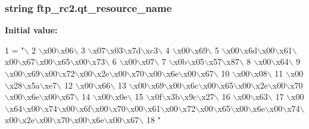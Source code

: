 \subsubsection[{qt\+\_\+resource\+\_\+name}]{\setlength{\rightskip}{0pt plus 5cm}string ftp\+\_\+rc2.\+qt\+\_\+resource\+\_\+name}\label{namespaceftp__rc2_a9c75f2e32727616d24caa952d6aeaa1f}
{\bfseries Initial value\+:}
\begin{DoxyCode}
1 = \textcolor{stringliteral}{"\(\backslash\)}
2 \textcolor{stringliteral}{\(\backslash\)x00\(\backslash\)x06\(\backslash\)}
3 \textcolor{stringliteral}{\(\backslash\)x07\(\backslash\)x03\(\backslash\)x7d\(\backslash\)xc3\(\backslash\)}
4 \textcolor{stringliteral}{\(\backslash\)x00\(\backslash\)x69\(\backslash\)}
5 \textcolor{stringliteral}{\(\backslash\)x00\(\backslash\)x6d\(\backslash\)x00\(\backslash\)x61\(\backslash\)x00\(\backslash\)x67\(\backslash\)x00\(\backslash\)x65\(\backslash\)x00\(\backslash\)x73\(\backslash\)}
6 \textcolor{stringliteral}{\(\backslash\)x00\(\backslash\)x07\(\backslash\)}
7 \textcolor{stringliteral}{\(\backslash\)x0b\(\backslash\)x05\(\backslash\)x57\(\backslash\)x87\(\backslash\)}
8 \textcolor{stringliteral}{\(\backslash\)x00\(\backslash\)x64\(\backslash\)}
9 \textcolor{stringliteral}{\(\backslash\)x00\(\backslash\)x69\(\backslash\)x00\(\backslash\)x72\(\backslash\)x00\(\backslash\)x2e\(\backslash\)x00\(\backslash\)x70\(\backslash\)x00\(\backslash\)x6e\(\backslash\)x00\(\backslash\)x67\(\backslash\)}
10 \textcolor{stringliteral}{\(\backslash\)x00\(\backslash\)x08\(\backslash\)}
11 \textcolor{stringliteral}{\(\backslash\)x00\(\backslash\)x28\(\backslash\)x5a\(\backslash\)xe7\(\backslash\)}
12 \textcolor{stringliteral}{\(\backslash\)x00\(\backslash\)x66\(\backslash\)}
13 \textcolor{stringliteral}{\(\backslash\)x00\(\backslash\)x69\(\backslash\)x00\(\backslash\)x6c\(\backslash\)x00\(\backslash\)x65\(\backslash\)x00\(\backslash\)x2e\(\backslash\)x00\(\backslash\)x70\(\backslash\)x00\(\backslash\)x6e\(\backslash\)x00\(\backslash\)x67\(\backslash\)}
14 \textcolor{stringliteral}{\(\backslash\)x00\(\backslash\)x0e\(\backslash\)}
15 \textcolor{stringliteral}{\(\backslash\)x0f\(\backslash\)x3b\(\backslash\)x9c\(\backslash\)x27\(\backslash\)}
16 \textcolor{stringliteral}{\(\backslash\)x00\(\backslash\)x63\(\backslash\)}
17 \textcolor{stringliteral}{\(\backslash\)x00\(\backslash\)x64\(\backslash\)x00\(\backslash\)x74\(\backslash\)x00\(\backslash\)x6f\(\backslash\)x00\(\backslash\)x70\(\backslash\)x00\(\backslash\)x61\(\backslash\)x00\(\backslash\)x72\(\backslash\)x00\(\backslash\)x65\(\backslash\)x00\(\backslash\)x6e\(\backslash\)x00\(\backslash\)x74\(\backslash\)x00\(\backslash\)x2e\(\backslash\)x00\(\backslash\)x70\(\backslash\)x00\(\backslash\)x6e\(\backslash\)x00\(\backslash\)x67\(\backslash\)}
18 \textcolor{stringliteral}{"}
\end{DoxyCode}
\hypertarget{namespaceftp__rc2_af8b926d6b850f7d5d5f77c48ee02504a}{}
